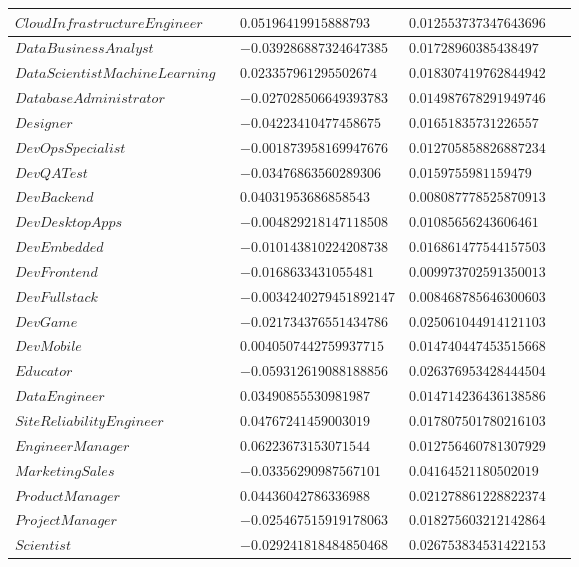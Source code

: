 \documentclass{report}
\begin{document}
\begin{longtable}{|R{0.4\linewidth}|R{0.3\linewidth}|R{0.3\linewidth}|}
  \hline
  $CloudInfrastructureEngineer$ & $0.05196419915888793$ & $0.012553737347643696$\\
  \hline
  $DataBusinessAnalyst$ & $-0.039286887324647385$ & $0.01728960385438497$\\
  \hline
  $DataScientistMachineLearning$ & $0.023357961295502674$ & $0.018307419762844942$\\
  \hline
  $DatabaseAdministrator$ & $-0.027028506649393783$ & $0.014987678291949746$\\
  \hline
  $Designer$ & $-0.04223410477458675$ & $0.01651835731226557$\\
  \hline
  $DevOpsSpecialist$ & $-0.001873958169947676$ & $0.012705858826887234$\\
  \hline
  $DevQATest$ & $-0.03476863560289306$ & $0.0159755981159479$\\
  \hline
  $DevBackend$ & $0.04031953686858543$ & $0.008087778525870913$\\
  \hline
  $DevDesktopApps$ & $-0.004829218147118508$ & $0.01085656243606461$\\
  \hline
  $DevEmbedded$ & $-0.010143810224208738$ & $0.016861477544157503$\\
  \hline
  $DevFrontend$ & $-0.0168633431055481$ & $0.009973702591350013$\\
  \hline
  $DevFullstack$ & $-0.0034240279451892147$ & $0.008468785646300603$\\
  \hline
  $DevGame$ & $-0.021734376551434786$ & $0.025061044914121103$\\
  \hline
  $DevMobile$ & $0.0040507442759937715$ & $0.014740447453515668$\\
  \hline
  $Educator$ & $-0.059312619088188856$ & $0.026376953428444504$\\
  \hline
  $DataEngineer$ & $0.03490855530981987$ & $0.014714236436138586$\\
  \hline
  $SiteReliabilityEngineer$ & $0.04767241459003019$ & $0.017807501780216103$\\
  \hline
  $EngineerManager$ & $0.06223673153071544$ & $0.012756460781307929$\\
  \hline
  $MarketingSales$ & $-0.03356290987567101$ & $0.04164521180502019$\\
  \hline
  $ProductManager$ & $0.04436042786336988$ & $0.021278861228822374$\\
  \hline
  $ProjectManager$ & $-0.025467515919178063$ & $0.018275603212142864$\\
  \hline
  $Scientist$ & $-0.029241818484850468$ & $0.026753834531422153$\\

\end{longtable}
\end{document}
